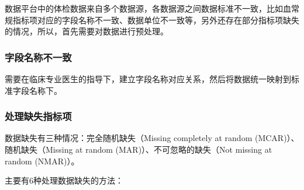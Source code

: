 \documentclass[UTF8,a4paper,12pt, onecolumn]{ctexart}
\begin{document}
数据平台中的体检数据来自多个数据源，各数据源之间数据标准不一致，比如血常规指标项对应的字段名称不一致、数据单位不一致等，另外还存在部分指标项缺失的情况，所以，首先需要对数据进行预处理。

\subsubsection{字段名称不一致}

需要在临床专业医生的指导下，建立字段名称对应关系，然后将数据统一映射到标准字段名称下。

\subsubsection{处理缺失指标项}

数据缺失有三种情况：完全随机缺失（Missing completely at random (MCAR)）、随机缺失（Missing at random (MAR)）、不可忽略的缺失（Not missing at random (NMAR)）。

主要有6种处理数据缺失的方法：
\end{document}
